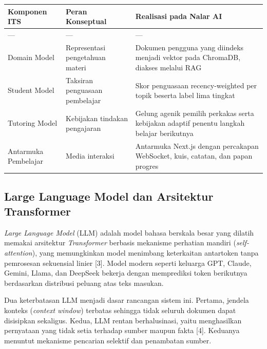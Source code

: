 \documentclass[12pt,a4paper]{article}
\begin{document}
\begin{table}[h]

\centering

\begin{tabular}{lll}

\toprule

Komponen ITS & Peran Konseptual & Realisasi pada Nalar AI \\

\midrule

--- & --- & --- \\

Domain Model & Representasi pengetahuan materi & Dokumen pengguna yang diindeks menjadi vektor pada ChromaDB, diakses melalui RAG \\

Student Model & Taksiran penguasaan pembelajar & Skor penguasaan recency-weighted per topik beserta label lima tingkat \\

Tutoring Model & Kebijakan tindakan pengajaran & Gelung agenik pemilih perkakas serta kebijakan adaptif penentu langkah belajar berikutnya \\

Antarmuka Pembelajar & Media interaksi & Antarmuka Next.js dengan percakapan WebSocket, kuis, catatan, dan papan progres \\

\bottomrule

\end{tabular}

\end{table}

\subsection*{Large Language Model dan Arsitektur Transformer}

\textit{Large Language Model} (LLM) adalah model bahasa berskala besar yang dilatih memakai arsitektur \textit{Transformer} berbasis mekanisme perhatian mandiri (\textit{self-attention}), yang memungkinkan model menimbang keterkaitan antartoken tanpa pemrosesan sekuensial linier {[}3{]}. Model modern seperti keluarga GPT, Claude, Gemini, Llama, dan DeepSeek bekerja dengan memprediksi token berikutnya berdasarkan distribusi peluang atas teks masukan.



Dua keterbatasan LLM menjadi dasar rancangan sistem ini. Pertama, jendela konteks (\textit{context window}) terbatas sehingga tidak seluruh dokumen dapat disisipkan sekaligus. Kedua, LLM rentan berhalusinasi, yaitu menghasilkan pernyataan yang tidak setia terhadap sumber maupun fakta {[}4{]}. Keduanya menuntut mekanisme pencarian selektif dan penambatan sumber.
\end{document}
